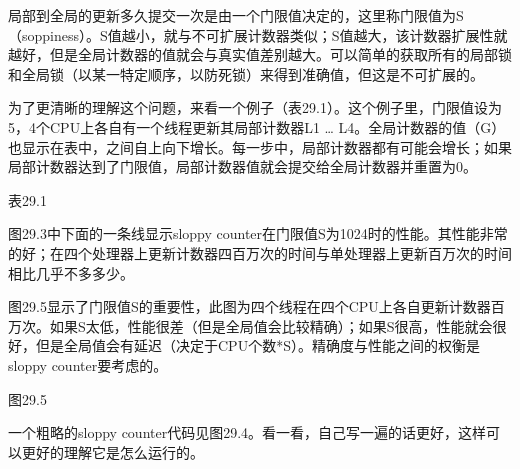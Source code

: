 局部到全局的更新多久提交一次是由一个门限值决定的，这里称门限值为S（soppiness）。S值越小，就与不可扩展计数器类似；S值越大，该计数器扩展性就越好，但是全局计数器的值就会与真实值差别越大。可以简单的获取所有的局部锁和全局锁（以某一特定顺序，以防死锁）来得到准确值，但这是不可扩展的。

为了更清晰的理解这个问题，来看一个例子（表29.1）。这个例子里，门限值设为5，4个CPU上各自有一个线程更新其局部计数器L1 … L4。全局计数器的值（G）也显示在表中，之间自上向下增长。每一步中，局部计数器都有可能会增长；如果局部计数器达到了门限值，局部计数器值就会提交给全局计数器并重置为0。
\begin{figure}[h]

\caption{}
\end{figure}
表29.1

图29.3中下面的一条线显示sloppy counter在门限值S为1024时的性能。其性能非常的好；在四个处理器上更新计数器四百万次的时间与单处理器上更新百万次的时间相比几乎不多多少。

图29.5显示了门限值S的重要性，此图为四个线程在四个CPU上各自更新计数器百万次。如果S太低，性能很差（但是全局值会比较精确）；如果S很高，性能就会很好，但是全局值会有延迟（决定于CPU个数*S）。精确度与性能之间的权衡是sloppy counter要考虑的。

\begin{figure}[h]

\caption{}
\end{figure}
图29.5

一个粗略的sloppy counter代码见图29.4。看一看，自己写一遍的话更好，这样可以更好的理解它是怎么运行的。


